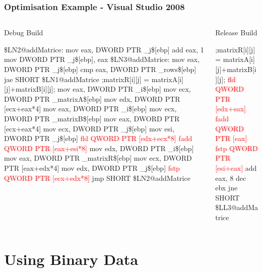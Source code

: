 \documentclass[smaller,table]{beamer} %
\begin{document}
\begin{frame}[fragile]
\frametitle{Optimisation Example - Visual Studio 2008}
\begin{columns}
\begin{column}{5cm}
\begin{center}
Debug Build
\end{center}
\begin{semiverbatim}
\tiny
\$LN2@addMatrice:
        mov     eax, DWORD PTR \_j\$[ebp]
        add     eax, 1
        mov     DWORD PTR \_j\$[ebp], eax
\$LN3@addMatrice:
        mov     eax, DWORD PTR \_j\$[ebp]
        cmp     eax, DWORD PTR \_rows\$[ebp]
        jae     SHORT \$LN1@addMatrice
;matrixR[i][j] = matrixA[i][j]+matrixB[i][j];
        mov     eax, DWORD PTR \_i\$[ebp]
        mov     ecx, DWORD PTR \_matrixA\$[ebp]
        mov     edx, DWORD PTR [ecx+eax*4]
        mov     eax, DWORD PTR \_i\$[ebp]
        mov     ecx, DWORD PTR \_matrixB\$[ebp]
        mov     eax, DWORD PTR [ecx+eax*4]
        mov     ecx, DWORD PTR \_j\$[ebp]
        mov     esi, DWORD PTR \_j\$[ebp]
\textcolor{red}{        fld     QWORD PTR [edx+ecx*8]}
\textcolor{red}{        fadd    QWORD PTR [eax+esi*8]}
        mov     edx, DWORD PTR \_i\$[ebp]
        mov     eax, DWORD PTR \_matrixR\$[ebp]
        mov     ecx, DWORD PTR [eax+edx*4]
        mov     edx, DWORD PTR \_j\$[ebp]
\textcolor{red}{        fstp    QWORD PTR [ecx+edx*8]}
        jmp     SHORT \$LN2@addMatrice
\end{semiverbatim}
\end{column}
\begin{column}{5cm}
\begin{center}
Release Build
\end{center}
\begin{semiverbatim}
\tiny
;matrixR[i][j] = matrixA[i][j]+matrixB[i][j];
\textcolor{red}{                fld     QWORD PTR [edx+eax]}
\textcolor{red}{                fadd    QWORD PTR [eax]}
\textcolor{red}{                fstp    QWORD PTR [esi+eax]}
        add     eax, 8
        dec     ebx
        jne     SHORT \$LL3@addMatrice
\end{semiverbatim}
\vspace{1.55in}
\end{column}
\end{columns}
\end{frame}

\section{Using Binary Data}
\end{document}
